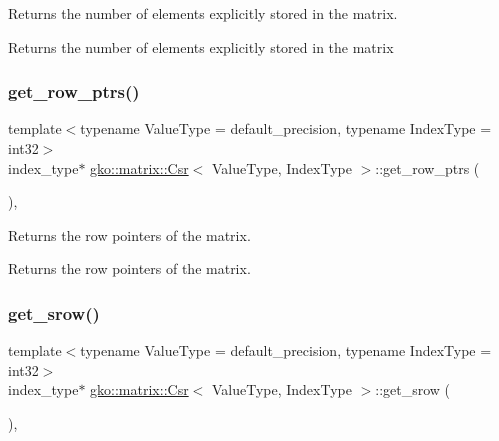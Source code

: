 Returns the number of elements explicitly stored in the matrix. 

\begin{DoxyReturn}{Returns}
the number of elements explicitly stored in the matrix 
\end{DoxyReturn}
\mbox{\label{classgko_1_1matrix_1_1Csr_a068e5158cf282fa977f0a137f8cd7f03}} 
\subsubsection{\texorpdfstring{get\+\_\+row\+\_\+ptrs()}{get\_row\_ptrs()}}
{\footnotesize\ttfamily template$<$typename Value\+Type = default\+\_\+precision, typename Index\+Type = int32$>$ \\
index\+\_\+type$\ast$ \hyperlink{classgko_1_1matrix_1_1Csr}{gko\+::matrix\+::\+Csr}$<$ Value\+Type, Index\+Type $>$\+::get\+\_\+row\+\_\+ptrs (\begin{DoxyParamCaption}{ }\end{DoxyParamCaption})\hspace{0.3cm}{\ttfamily [inline]}, {\ttfamily [noexcept]}}



Returns the row pointers of the matrix. 

\begin{DoxyReturn}{Returns}
the row pointers of the matrix. 
\end{DoxyReturn}
\mbox{\label{classgko_1_1matrix_1_1Csr_a919fb1efdcbde6fba7eb18bdc39ba46a}} 
\subsubsection{\texorpdfstring{get\+\_\+srow()}{get\_srow()}}
{\footnotesize\ttfamily template$<$typename Value\+Type = default\+\_\+precision, typename Index\+Type = int32$>$ \\
index\+\_\+type$\ast$ \hyperlink{classgko_1_1matrix_1_1Csr}{gko\+::matrix\+::\+Csr}$<$ Value\+Type, Index\+Type $>$\+::get\+\_\+srow (\begin{DoxyParamCaption}{ }\end{DoxyParamCaption})\hspace{0.3cm}{\ttfamily [inline]}, {\ttfamily [noexcept]}}



